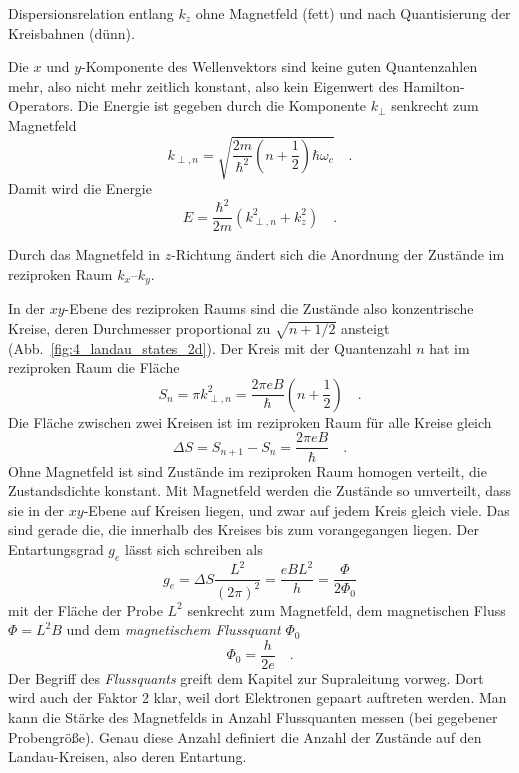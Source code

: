 \begin{marginfigure}
   \caption{Dispersionsrelation entlang $k_z$ ohne Magnetfeld (fett) und nach Quantisierung der Kreisbahnen (dünn). \label{fig:4_dispersion_3d_b}}
\end{marginfigure}

Die $x$ und $y$-Komponente des Wellenvektors sind keine guten Quantenzahlen mehr, also nicht mehr zeitlich konstant, also kein Eigenwert des Hamilton-Operators. Die Energie ist gegeben durch die Komponente $k_\perp$ senkrecht zum Magnetfeld
\begin{equation}
   k_{\perp, n} = \sqrt{ \frac{2m}{\hbar^2} \left( n + \frac{1}{2}\right) \hbar \omega_c} \quad .
\end{equation}
Damit wird die Energie 
\begin{equation}
   E  = \frac{\hbar^2}{2m}  \left( k_{\perp, n}^2 + k_z^2 \right)  \quad .
\end{equation}
%
\begin{marginfigure}
   \caption{Durch das Magnetfeld in $z$-Richtung ändert sich die Anordnung der Zustände im reziproken Raum $k_x$--$k_y$. \label{fig:4_landau_states_2d}}
\end{marginfigure}
%
In der $xy$-Ebene des reziproken Raums sind die Zustände also konzentrische Kreise, deren Durchmesser proportional zu $\sqrt{n +1/2}$ ansteigt (Abb.~\ref{fig:4_landau_states_2d}). Der Kreis mit der Quantenzahl $n$ hat im reziproken Raum die Fläche
\begin{equation}
S_n = \pi  k_{\perp, n}^2 = \frac{2 \pi e B}{\hbar} \left( n + \frac{1}{2}\right) \quad .  \label{eq:4_Sn}
\end{equation}
Die Fläche zwischen zwei Kreisen ist im reziproken Raum für alle Kreise gleich
\begin{equation}
   \Delta S = S_{n+1} - S_n = \frac{2 \pi e B}{\hbar} \quad . 
\end{equation}
Ohne Magnetfeld ist sind Zustände im reziproken Raum homogen verteilt, die Zustandsdichte konstant. Mit Magnetfeld werden die Zustände so umverteilt, dass sie in der $xy$-Ebene auf Kreisen liegen, und zwar auf jedem Kreis gleich viele. Das sind gerade die, die innerhalb des Kreises bis zum vorangegangen liegen. Der Entartungsgrad $g_e$ lässt sich schreiben als
\begin{equation}
   g_e =  \Delta S \frac{L^2}{(2\pi)^2} = \frac{e B L^2}{h} = \frac{\Phi}{2 \Phi_0} \label{eq:4_landau_entartung}
\end{equation}
mit der Fläche der Probe $L^2$ senkrecht zum Magnetfeld, dem magnetischen Fluss $\Phi = L^2 B$ und dem \emph{magnetischem Flussquant} $\Phi_0$
\begin{equation}
   \Phi_0 = \frac{h}{2 e} \quad .
\end{equation}
Der Begriff des \emph{Flussquants} greift dem Kapitel zur Supraleitung vorweg. Dort wird auch der Faktor 2 klar, weil dort Elektronen gepaart auftreten werden. Man kann die Stärke des Magnetfelds in Anzahl Flussquanten messen (bei gegebener Probengröße). Genau diese Anzahl definiert die Anzahl der Zustände auf den Landau-Kreisen, also deren Entartung.




